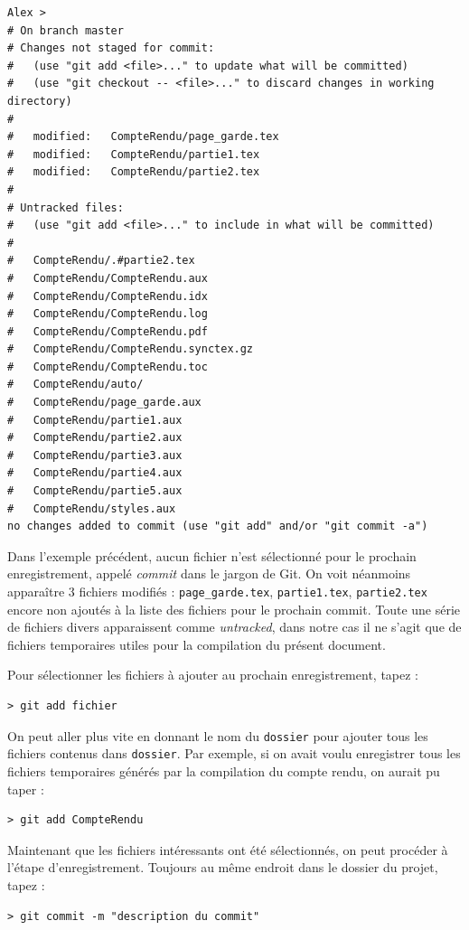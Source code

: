 \begin{verbatim}
Alex > 
# On branch master
# Changes not staged for commit:
#   (use "git add <file>..." to update what will be committed)
#   (use "git checkout -- <file>..." to discard changes in working directory)
#
#	modified:   CompteRendu/page_garde.tex
#	modified:   CompteRendu/partie1.tex
#	modified:   CompteRendu/partie2.tex
#
# Untracked files:
#   (use "git add <file>..." to include in what will be committed)
#
#	CompteRendu/.#partie2.tex
#	CompteRendu/CompteRendu.aux
#	CompteRendu/CompteRendu.idx
#	CompteRendu/CompteRendu.log
#	CompteRendu/CompteRendu.pdf
#	CompteRendu/CompteRendu.synctex.gz
#	CompteRendu/CompteRendu.toc
#	CompteRendu/auto/
#	CompteRendu/page_garde.aux
#	CompteRendu/partie1.aux
#	CompteRendu/partie2.aux
#	CompteRendu/partie3.aux
#	CompteRendu/partie4.aux
#	CompteRendu/partie5.aux
#	CompteRendu/styles.aux
no changes added to commit (use "git add" and/or "git commit -a")
\end{verbatim}

\par Dans l'exemple précédent, aucun fichier n'est sélectionné pour le prochain enregistrement, appelé \emph{commit} dans le jargon de Git. On voit néanmoins apparaître 3 fichiers modifiés : \texttt{page\_garde.tex}, \texttt{partie1.tex}, \texttt{partie2.tex} encore non ajoutés à la liste des fichiers pour le prochain commit. Toute une série de fichiers divers apparaissent comme \emph{untracked}, dans notre cas il ne s'agit que de fichiers temporaires utiles pour la compilation du présent document. 

\par Pour sélectionner les fichiers à ajouter au prochain enregistrement, tapez :
\begin{verbatim}
> git add fichier 
\end{verbatim}

\par On peut aller plus vite en donnant le nom du \texttt{dossier} pour ajouter tous les fichiers contenus dans \texttt{dossier}. Par exemple, si on avait voulu enregistrer tous les fichiers temporaires générés par la compilation du compte rendu, on aurait pu taper :
\begin{verbatim}
> git add CompteRendu
\end{verbatim}

\par Maintenant que les fichiers intéressants ont été sélectionnés, on peut procéder à l'étape d'enregistrement. Toujours au même endroit dans le dossier du projet, tapez :
\begin{verbatim}
> git commit -m "description du commit"
\end{verbatim}

